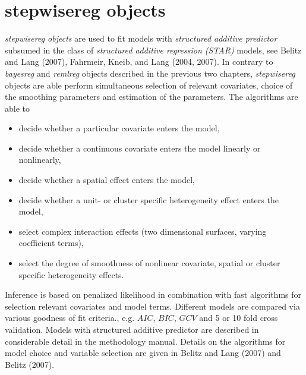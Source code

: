 \chapter{stepwisereg objects}
\normalsize
\label{stepwisereg} 

{\em stepwisereg objects} are used to fit models with {\em structured
additive predictor} subsumed in the class of {\em structured
additive regression (STAR)} models, see Belitz and Lang (2007),
Fahrmeir, Kneib, and Lang (2004, 2007). In contrary to {\em bayesreg} and
{\em remlreg} objects described in the previous two chapters, {\em stepwisereg}
objects are able perform simultaneous selection of relevant covariates, choice of the
smoothing parameters and  estimation of the parameters. The algorithms are able to
\begin{itemize}
\item decide whether a particular covariate enters the model,
\item decide whether a continuous covariate enters the model linearly or nonlinearly,
\item decide whether a spatial effect enters the model,
\item decide whether a unit- or cluster specific heterogeneity effect enters the model,
\item select complex interaction effects (two dimensional surfaces, varying coefficient terms),
\item select the degree of smoothness of  nonlinear covariate, spatial or cluster specific heterogeneity effects.
\end{itemize}
Inference is based on penalized likelihood in combination with fast algorithms for selection relevant covariates
and model terms. Different models are compared via various goodness of fit criteria., e.g. $AIC$, $BIC$, $GCV$ and 5 or 10 fold cross
validation. Models with structured additive predictor are described in considerable detail in
the methodology manual. Details on the algorithms for model choice and variable selection are given in Belitz and Lang (2007) and Belitz (2007).

     


